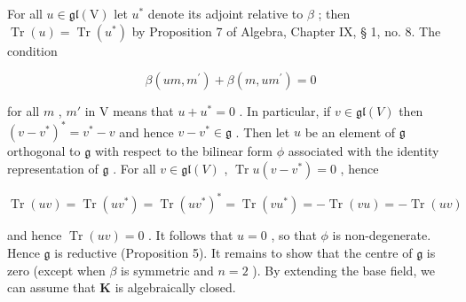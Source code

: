 For all \(u \in \mathfrak{gl}(\mathrm{V})\) let \(u^*\) denote its adjoint relative to \(\beta\) ; then \(\operatorname{Tr}(u) = \operatorname{Tr}(u^*)\) by Proposition 7 of Algebra, Chapter IX, § 1, no. 8. The condition

\[
\beta (u m, m ^ {\prime}) + \beta (m, u m ^ {\prime}) = 0
\]

for all \(m\) , \(m'\) in V means that \(u + u^{*} = 0\) . In particular, if \(v \in \mathfrak{gl}(V)\) then \((v - v^{*})^{*} = v^{*} - v\) and hence \(v - v^{*} \in \mathfrak{g}\) . Then let \(u\) be an element of \(\mathfrak{g}\) orthogonal to \(\mathfrak{g}\) with respect to the bilinear form \(\phi\) associated with the identity representation of \(\mathfrak{g}\) . For all \(v \in \mathfrak{gl}(V)\) , \(\operatorname{Tr} u(v - v^{*}) = 0\) , hence

\[
\operatorname{Tr} (u v) = \operatorname{Tr} (u v ^ {*}) = \operatorname{Tr} (u v ^ {*}) ^ {*} = \operatorname{Tr} (v u ^ {*}) = - \operatorname{Tr} (v u) = - \operatorname{Tr} (u v)
\]

and hence \(\operatorname{Tr}(u v) = 0\) . It follows that \(u = 0\) , so that \(\phi\) is non-degenerate. Hence \(\mathfrak{g}\) is reductive (Proposition 5). It remains to show that the centre of \(\mathfrak{g}\) is zero (except when \(\beta\) is symmetric and \(n = 2\) ). By extending the base field, we can assume that \(\mathbf{K}\) is algebraically closed.

